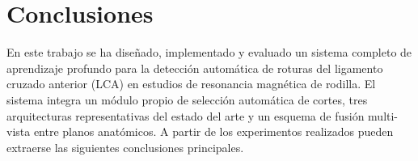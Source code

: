 
\section{Conclusiones}

En este trabajo se ha diseñado, implementado y evaluado un sistema completo de aprendizaje profundo para la detección automática de roturas del ligamento cruzado anterior (LCA) en estudios de resonancia magnética de rodilla. El sistema integra un módulo propio de selección automática de cortes, tres arquitecturas representativas del estado del arte y un esquema de fusión multi-vista entre planos anatómicos. A partir de los experimentos realizados pueden extraerse las siguientes conclusiones principales.

